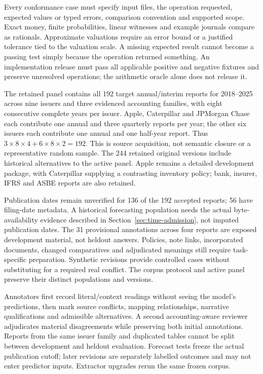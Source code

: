 Every conformance case must specify input files, the operation requested,
expected values or typed errors, comparison convention and supported scope.
Exact money, finite probabilities, linear witnesses and example journals
compare as rationals. Approximate valuations require an error bound or a
justified tolerance tied to the valuation scale. A missing expected result
cannot become a passing test simply because the operation returned something.
An implementation release must pass all applicable positive and negative
fixtures and preserve unresolved operations; the arithmetic oracle alone
does not release it.

The retained panel contains all 192 target annual/interim reports for
2018--2025 across nine issuers and three evidenced accounting families, with
eight consecutive complete years per issuer. Apple, Caterpillar and JPMorgan
Chase each contribute one annual and three quarterly reports per year; the
other six issuers each contribute one annual and one half-year report. Thus
$3\times8\times4+6\times8\times2=192$. This is source acquisition, not
semantic closure or a representative random sample. The 244 retained original
versions include historical alternatives to the active panel. Apple remains
a detailed development package, with Caterpillar supplying a contrasting
inventory policy; bank, insurer, IFRS and ASBE reports are also retained.

Publication dates remain unverified for 136 of the 192 accepted reports; 56 have
filing-date metadata. A historical forecasting population needs the actual
byte-availability evidence described in Section~\ref{sec:time-admission},
not imputed publication dates. The 31 provisional annotations across four
reports are exposed development material, not heldout answers. Policies, note
links, incorporated documents, changed comparatives and adjudicated meanings
still require task-specific preparation. Synthetic revisions provide controlled
cases without substituting for a required real conflict. The corpus protocol
and active panel preserve their distinct populations and versions.

Annotators first record literal/context readings without seeing the model's
predictions, then mark source conflicts, mapping relationships, narrative
qualifications and admissible alternatives. A second accounting-aware reviewer
adjudicates material disagreements while preserving both initial annotations.
Reports from the same issuer family and duplicated tables cannot be split
between development and heldout evaluation. Forecast tests freeze the actual
publication cutoff; later revisions are separately labelled outcomes and may
not enter predictor inputs. Extractor upgrades rerun the same frozen corpus.

